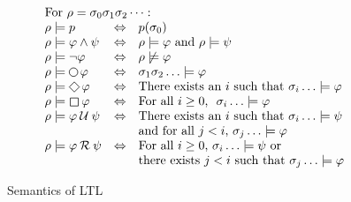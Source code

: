 \documentclass[sigplan,nonacm,10pt]{acmart}
\newcommand{\Next}{\operatorname{%
  \tikz[baseline]{
    \draw[line width=.12ex]
      (0,.6ex) circle (.8ex);
  }}}{}
\newcommand{\Eventually}{\operatorname{%
  \tikz[baseline]{
    \draw[line width=.12ex,line join=round]
      (0ex,.6ex) -- (.95ex,1.55ex) -- (1.9ex,.6ex) -- (.95ex,-.35ex) -- cycle;
  }}}{}
\newcommand{\Always}{\operatorname{%
  \tikz[baseline]{
    \draw[draw=white] (-0.2ex,0ex) -- (1.7ex,0ex);
    \draw[line width=.12ex,line join=round]
      (0ex,-.2ex) -- (0ex,1.3ex) -- (1.5ex,1.3ex) -- (1.5ex,.-.2ex) -- cycle;
  }}}{}
\newcommand{\Until}{\mathbin{%
  \mathcal{U}}}{}
\newcommand{\Release}{\mathbin{%
  \mathcal{R}}}{}
\begin{document}
\begin{figure}
  \[
  \begin{array}{lcl}
    \multicolumn{3}{l}{\text{For}\ \rho = \sigma_0\sigma_1\sigma_2\dots:}\\
    \rho \models p & \Leftrightarrow &p(\sigma_0)\\
    \rho \models \varphi \land \psi  &\Leftrightarrow& \rho \models \varphi\ \text{and}\  \rho \models \psi \\
    \rho \models \neg \varphi &\Leftrightarrow& \rho \not\models \varphi \\
    \rho \models \Next \varphi &\Leftrightarrow& \sigma_1\sigma_2\dots \models \varphi \\
    \rho \models \Eventually \varphi &\Leftrightarrow& \text{There exists an $i$ such that}\ \sigma_i\dots \models \varphi \\
    \rho \models \Always \varphi &\Leftrightarrow& \text{For all $i \geq 0$, }\ \sigma_i\dots \models \varphi \\
    \rho \models \varphi \Until \psi &\Leftrightarrow& \text{There exists an $i$ such that}\ \sigma_i\dots \models \psi \\
    & & \text{and for all}\ j < i\text{,}\ \sigma_j\dots \models \varphi\\
    \rho \models \varphi \Release \psi &\Leftrightarrow& \text{For all $i \geq 0$,}\ \sigma_i\dots \models \psi\ \text{or} \\
    & & \text{there exists}\ j < i\text{ such that}\ \sigma_j\dots \models \varphi
  \end{array}
  \]
  \caption{Semantics of LTL}
  \label{fig:pnueli_ltl}
  \end{figure}
\end{document}
